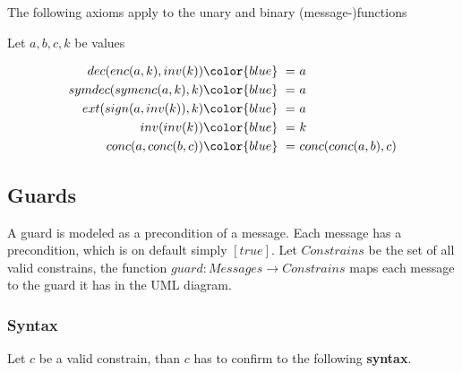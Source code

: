 \documentclass[12pt,journal,compsoc]{IEEEtran}
\newcommand{\conc}[2]{conc(#1,#2)}
\newcommand{\enc}[2]{enc(#1,#2)}
\newcommand{\symenc}[2]{symenc(#1,#2)}
\newcommand{\dec}[2]{dec(#1,#2)}
\newcommand{\symdec}[2]{symdec(#1,#2)}
\newcommand{\ext}[2]{ext(#1,#2)}
\newcommand{\sign}[2]{sign(#1,#2)}
\newcommand{\inv}[1]{inv(#1)}
\newcommand{\linesep}[0]{\newline}
\begin{document}
The following axioms apply to the unary and binary (message-)functions
\linesep 

Let $a,b,c,k$ be values
\begin{small}
\begin{align}
	\dec{\enc{a}{k}}{\inv{k}} 	&{\color{blue}\ =\ } a \\
	\symdec{\symenc{a}{k}}{k} 	&{\color{blue}\ =\ } a \\
	\ext{\sign{a}{\inv{k}}}{k}	&{\color{blue}\ =\ } a \\
	\inv{\inv{k}}				&{\color{blue}\ =\ } k \\
	\conc{a}{\conc{b}{c}}		&{\color{blue}\ =\ } \conc{\conc{a}{b}}{c} 
\end{align}
\end{small}

\subsection{Guards}

A guard is modeled as a precondition of a message. Each message has a precondition, 
which is on default simply $[true]$. Let $Constrains$ be the set of all valid constrains, 
the function $guard : Messages \to Constrains$ maps each message to the guard it has 
in the UML diagram.

\subsubsection{Syntax}
\label{subsubsec:guardssyntax}

Let $c$ be a valid constrain, than $c$ has to confirm to the following \textbf{syntax}.
\end{document}
